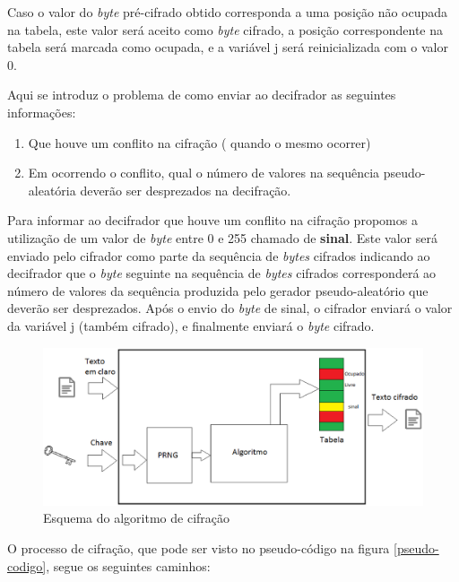 Caso o valor do \textit{byte} pré-cifrado obtido corresponda a uma posição não ocupada na tabela, este valor será aceito como \textit{byte} cifrado, a posição correspondente na tabela será marcada como ocupada, e a variável j será reinicializada com o valor 0.

Aqui se introduz o problema de como enviar ao decifrador as seguintes informações:

\begin{enumerate}
	\item Que houve um conflito na cifração ( quando o mesmo ocorrer)
	\item Em ocorrendo o conflito, qual o número de valores na sequência pseudo-aleatória deverão ser desprezados na decifração.
\end{enumerate}

Para informar ao decifrador que houve um conflito na cifração propomos a utilização de um valor de \textit{byte} entre 0 e 255 chamado de \textbf{sinal}. Este valor será enviado pelo cifrador como parte da sequência de \textit{bytes} cifrados indicando ao decifrador que o \textit{byte} seguinte na sequência de \textit{bytes} cifrados corresponderá ao número de valores da sequência produzida pelo gerador pseudo-aleatório que deverão ser desprezados.  Após o envio do \textit{byte} de sinal, o cifrador  enviará o valor da variável j (também cifrado), e finalmente enviará o \textit{byte} cifrado.

\begin{figure}[h]
	\centering
	\includegraphics[scale=0.5]{figuras/funcionamento.eps}
	\caption{Esquema do algoritmo de cifração}
\end{figure}

O processo de cifração, que pode ser visto no pseudo-código na figura \ref{pseudo-codigo}, segue os seguintes caminhos:


